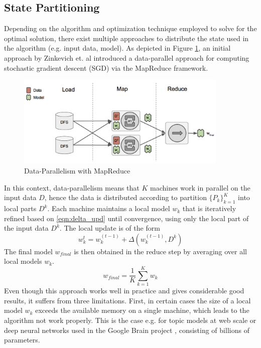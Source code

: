 \subsection{State Partitioning}
\label{ss:state_partitioning}
Depending on the algorithm and optimization technique employed to solve for the optimal solution, there exist multiple approaches to distribute the state used in the algorithm (e.g. input data, model).
As depicted in Figure \ref{fig:data_parallelism}, an initial approach by Zinkevich et. al \cite{zinkevich2010parallelized} introduced a data-parallel approach for computing stochastic gradient descent (SGD) via the MapReduce framework.
\begin{figure}[ht]
\centering
\includegraphics[width=0.9\textwidth]{img/data_parallelism.png}
\caption{Data-Parallelism with MapReduce}
\label{fig:data_parallelism}
\end{figure}
In this context, data-parallelism means that $K$ machines work in parallel on the input data $D$, hence the data is distributed according to partition $\{P_k\}_{k=1}^K$ into local parts $D^k$.
Each machine maintains a local model $w_k$ that is iteratively refined based on \ref{eqn:delta_upd} until convergence, using only the local part of the input data $D^k$.
The local update is of the form
\begin{equation}
w_k^{t} = w_k^{(t-1)} + \Delta(w_k^{(t-1)},D^k)
\label{eqn:local_delta_upd}
\end{equation}
The final model $w_{final}$ is then obtained in the reduce step by averaging over all local models $w_{k}$.
\begin{equation}
w_{final} = \frac{1}{K}\sum_{k=1}^{K}w_{k}
\label{eqn:avg_sgd}
\end{equation}
Even though this approach works well in practice and gives considerable good results, it suffers from three limitations.
First, in certain cases the size of a local model $w_k$ exceeds the available memory on a single machine, which leads to the algorithm not work properly.
This is the case e.g. for topic models at web scale or deep neural networks used in the Google Brain project \cite{dean2012large}, consisting of billions of parameters.
